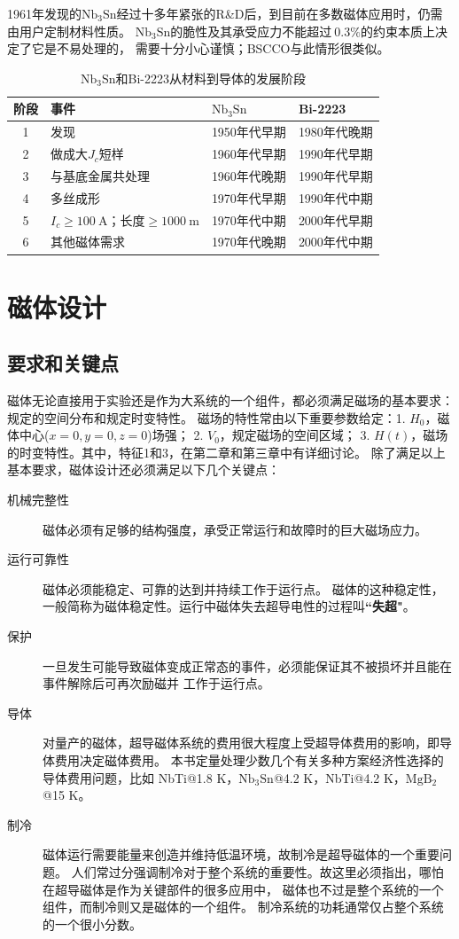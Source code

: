 1961年发现的$\mathrm{Nb_3Sn}$经过十多年紧张的R\&D后，到目前在多数磁体应用时，仍需由用户定制材料性质。
$\mathrm{Nb_3Sn}$的脆性及其承受应力不能超过$~0.3\%$的约束本质上决定了它是不易处理的，
需要十分小心谨慎；BSCCO与此情形很类似。
\begin{table}[htbp]\small
  \centering
  \caption{$\mathrm{Nb_3Sn}$和Bi-2223从材料到导体的发展阶段} \label{scstage}
\begin{tabular}{|c|l|l|l|}
  \hline
  阶段&事件& $\mathrm{Nb_3Sn}$ &Bi-2223 \\ \hline\hline
1 & 发现 & 1950年代早期& 1980年代晚期 \\ \hline
2 & 做成大$J_c$短样 & 1960年代早期 & 1990年代早期\\ \hline
3 &与基底金属共处理&1960年代晚期&1990年代早期\\ \hline
4 &多丝成形&1970年代早期&1990年代中期\\ \hline
5 &$I_c\ge 100\ \mathrm{A}$；长度$\ge 1000\ \mathrm{m}$ &1970年代中期&2000年代早期\\ \hline
6 &其他磁体需求&1970年代晚期&2000年代中期\\
  \hline
\end{tabular}
\end{table}


\section{磁体设计}
\subsection{要求和关键点}
磁体无论直接用于实验还是作为大系统的一个组件，都必须满足磁场的基本要求：规定的空间分布和规定时变特性。
磁场的特性常由以下重要参数给定：1. $H_0$，磁体中心($x=0, y=0, z=0$)场强；
2. $V_0$，规定磁场的空间区域；
3. $H(t)$，磁场的时变特性。其中，特征1和3，在第二章和第三章中有详细讨论。
除了满足以上基本要求，磁体设计还必须满足以下几个关键点：
\begin{description}
  \item[机械完整性] 磁体必须有足够的结构强度，承受正常运行和故障时的巨大磁场应力。
  \item[运行可靠性] 磁体必须能稳定、可靠的达到并持续工作于运行点。
  磁体的这种稳定性，一般简称为磁体稳定性。运行中磁体失去超导电性的过程叫\textbf{``失超"}。
  \item[保护] 一旦发生可能导致磁体变成正常态的事件，必须能保证其不被损坏并且能在事件解除后可再次励磁并
  工作于运行点。
  \item[导体] 对量产的磁体，超导磁体系统的费用很大程度上受超导体费用的影响，即导体费用决定磁体费用。
  本书定量处理少数几个有关多种方案经济性选择的导体费用问题，比如
NbTi@1.8 K，$\mathrm{Nb_3Sn}$@4.2 K，NbTi@4.2 K，$\mathrm{MgB_2}$@15 K。
  \item[制冷] 磁体运行需要能量来创造并维持低温环境，故制冷是超导磁体的一个重要问题。
  人们常过分强调制冷对于整个系统的重要性。故这里必须指出，哪怕在超导磁体是作为关键部件的很多应用中，
  磁体也不过是整个系统的一个组件，而制冷则又是磁体的一个组件。
  制冷系统的功耗通常仅占整个系统的一个很小分数。
\end{description}


